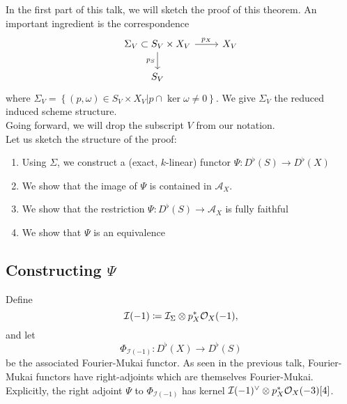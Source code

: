 In the first part of this talk, we will sketch the proof of this theorem. 
An important ingredient is the correspondence
\[\begin{tikzcd}
	{\Sigma_V \subset S_V\times X_V} & {X_V} \\
	{S_V}
	\arrow["{p_X}", from=1-1, to=1-2]
	\arrow["{p_S}"', from=1-1, to=2-1]
\end{tikzcd}\]
where $\Sigma_V= \left\{ ( p, \omega) \in S_V\times X_V | p \cap \ker \omega \neq 0 \right\} $. We give $\Sigma_V$ the reduced induced scheme structure.\\
Going forward, we will drop the subscript $V$ from our notation.\\

Let us sketch the structure of the proof:
\begin{enumerate}
\item Using $\Sigma$, we construct a (exact, $k$-linear) functor $\Psi\colon D^{\flat}( S) \to D^{\flat}( X)$
\item We show that the image of $\Psi$ is contained in $\mathcal{A}_X$.
\item We show that the restriction $\Psi\colon D^{\flat}( S) \to \mathcal{A}_X$ is fully faithful
\item We show that $\Psi$ is an equivalence
\end{enumerate}
\subsection*{Constructing $\Psi$ }
Define
\[ 
\mathcal{I}( -1) \coloneq \mathcal{I}_{\Sigma} \otimes p^{\ast}_X \mathcal{O}_X( -1),
\]
and let $$\Phi_{\mathcal{I}( -1) } \colon D^{\flat}( X) \to D^{\flat}( S)$$ be the associated Fourier-Mukai functor.
As seen in the previous talk, Fourier-Mukai functors have right-adjoints which are themselves Fourier-Mukai. 
Explicitly, the right adjoint $\Psi$ to $\Phi_{\mathcal{I}( -1) }$ has kernel $\mathcal{I}( -1)^{\vee}\otimes p_X^{\ast}\mathcal{O}_X( -3) [ 4] $.
